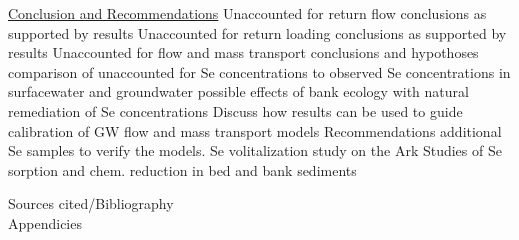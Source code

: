 \documentclass[12pt]{article}
\begin{document}
\begin{outline}[enumerate]
	\1 \underline{Conclusion and Recommendations}
		\2 Unaccounted for return flow conclusions as supported by results
		\2 Unaccounted for return loading conclusions as supported by results
		\2 Unaccounted for flow and mass transport conclusions and hypothoses
			\3 comparison of unaccounted for Se concentrations to observed Se concentrations in surfacewater and groundwater
			\3 possible effects of bank ecology with natural remediation of Se concentrations
			\3 Discuss how results can be used to guide calibration of GW flow and mass transport models
		\2 Recommendations
			\3 additional Se samples to verify the models.
			\3 Se volitalization study on the Ark
			\3 Studies of Se sorption and chem. reduction in bed and bank sediments
			
\end{outline}
Sources cited/Bibliography\\
Appendicies
\end{document}
